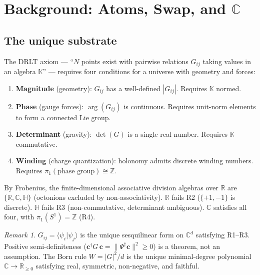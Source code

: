 \documentclass[12pt]{article}
\theoremstyle{remark}
\newtheorem{remark}[theorem]{Remark}
\begin{document}
{%
\section{Background: Atoms, Swap, and $\mathbb{C}$}

\subsection{The unique substrate}

The DRLT axiom --- ``$N$ points exist with pairwise relations $G_{ij}$ taking values in an algebra $\mathbb{K}$'' --- requires four conditions for a universe with geometry and forces:

\begin{enumerate}
\item[\textbf{R1.}] \textbf{Magnitude} (geometry): $G_{ij}$ has a well-defined $|G_{ij}|$. Requires $\mathbb{K}$ normed.
\item[\textbf{R2.}] \textbf{Phase} (gauge forces): $\arg(G_{ij})$ is continuous. Requires unit-norm elements to form a connected Lie group.
\item[\textbf{R3.}] \textbf{Determinant} (gravity): $\det(G)$ is a single real number. Requires $\mathbb{K}$ commutative.
\item[\textbf{R4.}] \textbf{Winding} (charge quantization): holonomy admits discrete winding numbers. Requires $\pi_1(\text{phase group}) \cong \mathbb{Z}$.
\end{enumerate}

By Frobenius, the finite-dimensional associative division algebras over $\mathbb{R}$ are $\{\mathbb{R}, \mathbb{C}, \mathbb{H}\}$ (octonions excluded by non-associativity). $\mathbb{R}$ fails R2 ($\{+1,-1\}$ is discrete). $\mathbb{H}$ fails R3 (non-commutative, determinant ambiguous). $\mathbb{C}$ satisfies all four, with $\pi_1(S^1) = \mathbb{Z}$ (R4).

\begin{remark}
$G_{ij} = \langle\psi_i|\psi_j\rangle$ is the unique sesquilinear form on $\mathbb{C}^d$ satisfying R1--R3. Positive semi-definiteness ($\mathbf{c}^\dagger G\,\mathbf{c} = \|\Psi^\dagger\mathbf{c}\|^2 \geq 0$) is a theorem, not an assumption. The Born rule $W = |G|^2/d$ is the unique minimal-degree polynomial $\mathbb{C} \to \mathbb{R}_{\geq 0}$ satisfying real, symmetric, non-negative, and faithful.
\end{remark}

}
\end{document}
